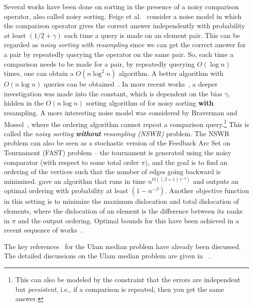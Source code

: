 Several works have been done on sorting in the presence of a noisy comparison operator, also called noisy sorting. Feige et al.~\cite{FRPU94} consider a noise model in which the comparison operator gives the correct answer independently with probability at least $(1/2 + \gamma)$ each time a query is made on an element pair. This can be regarded as {\em noisy sorting with resampling} since we can get the correct answer for a pair by repeatedly querying the operator on the same pair. So, each time a comparison needs to be made for a pair, by repeatedly querying $O(\log{n})$ times, one can obtain a $O(n \log^2{n})$ algorithm. 
A better algorithm with $O(n \log{n})$ queries can be obtained~\cite{FRPU94,kk07}.
In more recent works~\cite{wgw22,gx23}, a deeper investigation was made into the constant, which is dependent on the bias $\gamma$, hidden in the $O(n \log{n})$ sorting algorithm of \cite{FRPU94} for noisy sorting {\bf with} resampling.
A more interesting noise model was considered by Braverman and Mossel~\cite{bm08}, where the ordering algorithm cannot repeat a comparison query.\footnote{This can also be modeled by the constraint that the errors are independent but {\em persistent}, i.e., if a comparison is repeated, then you get the same answer.}
This is called the {\em noisy sorting \textbf{without} resampling (NSWR)} problem. The NSWR problem can also be seen as a stochastic version of the Feedback Arc Set on Tournament (FAST) problem -- the tournament is generated using the noisy comparator (with respect to some total order $\pi$), and the goal is to find an ordering of the vertices such that the number of edges going backward is minimized. \cite{bm08} gave an algorithm that runs in time $n^{O((\beta+1)\gamma^{-4})}$ and outputs an optimal ordering with probability at least $(1-n^{-\beta})$. Another objective function in this setting is to minimize the maximum dislocation and total dislocation of elements, where the dislocation of an element is the difference between its ranks in $\pi$ and the output ordering. 
Optimal bounds for this have been achieved in a recent sequence of works~\cite{gllp20,gllp19}.

The key references~\cite{cdk21,cdk23} for the Ulam median problem have already been discussed. The detailed discussions on the Ulam median problem are given in ~.